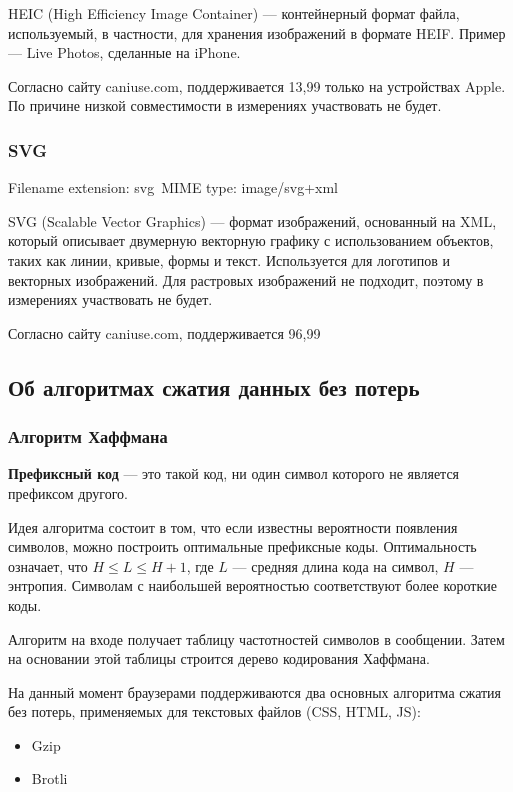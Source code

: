 \documentclass[12pt]{article}
\begin{document}
HEIC (High Efficiency Image Container) — контейнерный формат файла,
используемый, в частности, для хранения изображений в формате HEIF.
Пример — Live Photos, сделанные на iPhone.

Согласно сайту caniuse.com, поддерживается 13,99%
только на устройствах Apple. По причине низкой совместимости в измерениях участвовать не будет.

\subsubsection{SVG}
Filename extension: svg\
MIME type: image/svg+xml

SVG (Scalable Vector Graphics) — формат изображений, основанный на XML,
который описывает двумерную векторную графику с использованием объектов,
таких как линии, кривые, формы и текст. Используется для логотипов и векторных изображений.
Для растровых изображений не подходит, поэтому в измерениях участвовать не будет.

Согласно сайту caniuse.com, поддерживается 96,99%

\subsection{Об алгоритмах сжатия данных без потерь}

\subsubsection{Алгоритм Хаффмана}

\textbf{Префиксный код} — это такой код, ни один символ которого не является префиксом другого.

Идея алгоритма состоит в том, что если известны вероятности появления символов,
можно построить оптимальные префиксные коды. Оптимальность
означает, что $H \leq L \leq H + 1$, где $L$ — средняя длина кода на символ, $H$ — энтропия.
Символам с наибольшей вероятностью соответствуют более короткие коды.

Алгоритм на входе получает таблицу частотностей символов в сообщении.
Затем на основании этой таблицы строится дерево кодирования Хаффмана.

На данный момент браузерами поддерживаются два основных алгоритма сжатия без потерь,
применяемых для текстовых файлов (CSS, HTML, JS):

\begin{itemize}
    \item Gzip
    \item Brotli
\end{itemize}
\end{document}

